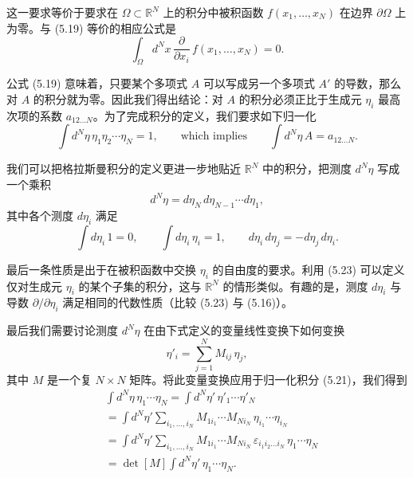 这一要求等价于要求在 $\Omega \subset \mathbb{R}^N$ 上的积分中被积函数 $f(x_1, \ldots, x_N)$ 在边界 $\partial\Omega$ 上为零。与 (5.19) 等价的相应公式是
\begin{equation}
  \int_{\Omega}d^Nx\,\frac{\partial}{\partial x_i}\,f(x_1, \ldots, x_N) = 0 .
\end{equation}

公式 (5.19) 意味着，只要某个多项式 $A$ 可以写成另一个多项式 $A'$ 的导数，那么对 $A$ 的积分就为零。因此我们得出结论：对 $A$ 的积分必须正比于生成元 $\eta_i$ 最高次项的系数 $a_{12\ldots N}$。为了完成积分的定义，我们要求如下归一化
\begin{equation}
  \int d^N\eta\,\eta_1\eta_2\cdots\eta_N = 1 ,
  \qquad \text{which implies} \qquad
  \int d^N\eta\,A = a_{12\ldots N} .
\end{equation}

我们可以把格拉斯曼积分的定义更进一步地贴近 $\mathbb{R}^N$ 中的积分，把测度 $d^N\eta$ 写成一个乘积
\begin{equation}
  d^N\eta = d\eta_N\,d\eta_{N-1}\cdots d\eta_1 ,
\end{equation}
其中各个测度 $d\eta_i$ 满足
\begin{equation}
  \int d\eta_i\,1 = 0, \qquad
  \int d\eta_i\,\eta_i = 1, \qquad
  d\eta_i\,d\eta_j = -d\eta_j\,d\eta_i .
\end{equation}

最后一条性质是出于在被积函数中交换 $\eta_i$ 的自由度的要求。利用 (5.23) 可以定义仅对生成元 $\eta_i$ 的某个子集的积分，这与 $\mathbb{R}^N$ 的情形类似。有趣的是，测度 $d\eta_i$ 与导数 $\partial/\partial\eta_i$ 满足相同的代数性质（比较 (5.23) 与 (5.16)）。

最后我们需要讨论测度 $d^N\eta$ 在由下式定义的变量线性变换下如何变换
\begin{equation}
  \eta'_i = \sum_{j=1}^{N}M_{ij}\,\eta_j ,
\end{equation}
其中 $M$ 是一个复 $N \times N$ 矩阵。将此变量变换应用于归一化积分 (5.21)，我们得到
\begin{equation}
  \begin{aligned}
    &\int d^N\eta\,\eta_1\cdots\eta_N
     = \int d^N\eta'\,\eta'_1\cdots\eta'_N\\
    &= \int d^N\eta'\sum_{i_1,\ldots,i_N}M_{1i_1}\cdots M_{Ni_N}\,
       \eta_{i_1}\cdots\eta_{i_N}\\
    &= \int d^N\eta'\sum_{i_1,\ldots,i_N}M_{1i_1}\cdots M_{Ni_N}\,
      \varepsilon_{i_1i_2\ldots i_N}\,\eta_1\cdots\eta_N\\
    &= \det[M]\int d^N\eta'\,\eta_1\cdots\eta_N .
  \end{aligned}
\end{equation}

